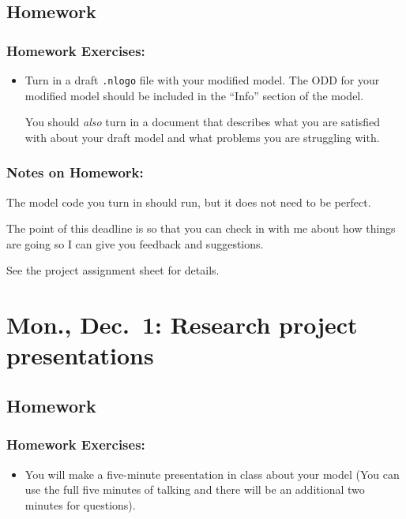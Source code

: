 \documentclass[
]{article}
\providecommand{\tightlist}{%
  \setlength{\itemsep}{0pt}\setlength{\parskip}{0pt}}
\begin{document}
\subsection{Homework}\label{homework-12}

\subsubsection{Homework Exercises:}\label{homework-exercises-12}

\begin{itemize}
\item
  Turn in a draft \texttt{.nlogo} file with your modified model. The ODD
  for your modified model should be included in the ``Info'' section of
  the model.

  You should \emph{also} turn in a document that describes what you are
  satisfied with about your draft model and what problems you are
  struggling with.
\end{itemize}

\subsubsection{Notes on Homework:}\label{notes-on-homework-8}

The model code you turn in should run, but it does not need to be
perfect.

The point of this deadline is so that you can check in with me about how
things are going so I can give you feedback and suggestions.

See the project assignment sheet for details.

\section{Mon., Dec.~1: Research project
presentations}\label{mon.-dec.-1-research-project-presentations}

\subsection{Homework}\label{homework-13}

\subsubsection{Homework Exercises:}\label{homework-exercises-13}

\begin{itemize}
\tightlist
\item
  You will make a five-minute presentation in class about your model
  (You can use the full five minutes of talking and there will be an
  additional two minutes for questions).
\end{itemize}
\end{document}
